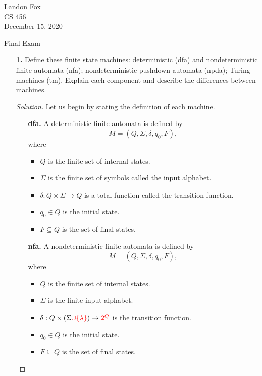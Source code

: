 \documentclass[ 12pt ]{article}
\begin{document}
\noindent Landon Fox \\
\noindent CS 456 \\
\noindent December 15, 2020

\begin{center}
	\Large Final Exam
\end{center}

\begin{enumerate}
	\item[\textbf{1.}] Define these finite state machines: deterministic (dfa) and nondeterministic finite automata (nfa); nondeterministic pushdown automata (npda); Turing machines
		(tm). Explain each component and describe the differences between machines.

		\begin{proof}[Solution]
			Let us begin by stating the definition of each machine.
			\begin{enumerate}
				\item[\textbf{dfa.}] A deterministic finite automata is defined by $$M = (Q, \Sigma, \delta, q_0, F),$$ where
					\begin{itemize}
						\item $Q$ is the finite set of internal states.
						\item $\Sigma$ is the finite set of symbols called the input alphabet.
						\item $\delta : Q \times \Sigma \to Q$ is a total function called the transition function.
						\item $q_0 \in Q$ is the initial state.
						\item $F \subseteq Q$ is the set of final states.
					\end{itemize}

				\item[\textbf{nfa.}] A nondeterministic finite automata is defined by $$M = (Q, \Sigma, \delta, q_0, F),$$ where
					\begin{itemize}
						\item $Q$ is the finite set of internal states.
						\item $\Sigma$ is the finite input alphabet.
						\item $\delta : Q \times (\Sigma \textcolor{red}{\cup \{ \lambda \}}) \to \textcolor{red}{2^Q}$ is the transition function.
						\item $q_0 \in Q$ is the initial state.
						\item $F \subseteq Q$ is the set of final states.
					\end{itemize}


\end{enumerate}
\end{proof}
\end{enumerate}
\end{document}
